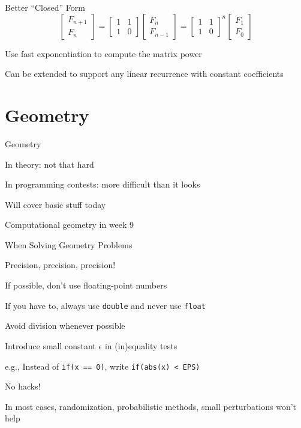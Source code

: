 \documentclass[13pt,onlymath]{beamer}
\begin{document}
\begin{frame}{Better ``Closed'' Form}
\[
\left[\begin{array}{c}F_{n+1} \\ F_n \end{array} \right] = 
\left[\begin{array}{cc}1&1\\1&0 \end{array} \right] \left[\begin{array}{c}F_n \\ F_{n-1} \end{array} \right] =
\left[\begin{array}{cc}1&1\\1&0 \end{array} \right]^n \left[\begin{array}{c}F_1 \\ F_0 \end{array} \right]
\]
\BIT
\item Use fast exponentiation to compute the matrix power
\item Can be extended to support any linear recurrence with constant coefficients
\EIT
\end{frame}

\section{Geometry}

\begin{frame}{Geometry}
\BIT
\item In theory: not that hard
\item In programming contests: more difficult than it looks
\item Will cover basic stuff today
\BIT
\item Computational geometry in week 9
\EIT
\EIT
\end{frame}

\begin{frame}[fragile]{When Solving Geometry Problems}
\BIT
\item Precision, precision, precision!
\BIT
\item If possible, don't use floating-point numbers
\item If you have to, always use \verb,double, and never use \verb,float,
\item Avoid division whenever possible
\item Introduce small constant $\epsilon$ in (in)equality tests
\BIT
\item e.g., Instead of \verb,if(x == 0),, write \verb,if(abs(x) < EPS),
\EIT
\EIT
\item No hacks!
\BIT
\item In most cases, randomization, probabilistic methods, small perturbations won't help
\EIT
\EIT
\end{frame}
\end{document}
